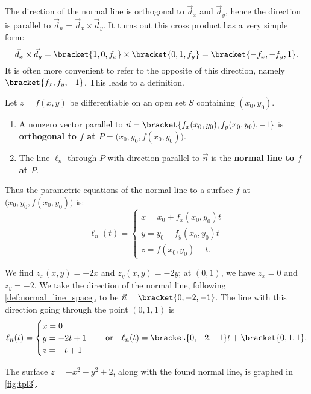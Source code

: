 The direction of the normal line is orthogonal to $\vec d_x$ and $\vec d_y$, hence the direction is parallel to $\vec d_n = \vec d_x\times \vec d_y$. It turns out this cross product has a very simple form:
\[ \vec d_x\times \vec d_y =\bracket{1,0,f_x}\times\bracket{0,1,f_y}=\bracket{-f_x,-f_y,1}.\]
It is often more convenient to refer to the opposite of this direction, namely $\bracket{f_x,f_y,-1}$. This leads to a definition.


{Let $z=f(x,y)$ be differentiable on an open set $S$ containing $(x_0,y_0)$.

\begin{enumerate}
\item	A nonzero vector parallel to $\vec n=\bracket{f_x(x_0,y_0),f_y(x_0,y_0),-1}$ is \textbf{orthogonal to $f$ at $P=\big(x_0,y_0,f(x_0,y_0)\big)$}.

\item The line $\ell_n$ through $P$ with direction parallel to $\vec n$ is the \textbf{normal line to $f$ at $P$}.
\end{enumerate}}

Thus the parametric equations of the normal line to a surface $f$ at $\big(x_0,y_0,f(x_0,y_0)\big)$ is:
\[
\ell_{n}(t) =
\begin{cases}
x = x_0 + f_x(x_0,y_0)t \\
y = y_0 + f_y(x_0,y_0)t \\
z = f(x_0,y_0) - t.
\end{cases}
\]

{We find $z_x(x,y) = -2x$ and $z_y(x,y) = -2y$; at $(0,1)$, we have $z_x = 0$ and $z_y = -2$. We take the direction of the normal line, following \autoref{def:normal_line_space}, to be $\vec n=\bracket{0,-2,-1}$. The line with this direction going through the point $(0,1,1)$ is 
%
%
\[
\ell_n(t) = \begin{cases}x=0\\y=-2t+1\\z=-t+1\end{cases}
\quad \text{or}\quad
\ell_n(t)=\bracket{0,-2,-1}t+\bracket{0,1,1}.
\]

The surface $z=-x^2-y^2+2$, along with the found normal line, is graphed in \autoref{fig:tpl3}.}

